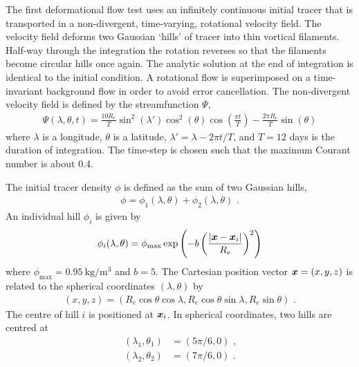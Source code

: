 The first deformational flow test uses an infinitely continuous initial tracer that is transported in a non-divergent, time-varying, rotational velocity field.
The velocity field deforms two Gaussian `hills' of tracer into thin vortical filaments.  Half-way through the integration the rotation reverses so that the filaments become circular hills once again.  The analytic solution at the end of integration is identical to the initial condition.
A rotational flow is superimposed on a time-invariant background flow in order to avoid error cancellation.
The non-divergent velocity field is defined by the streamfunction $\Psi$,
\begin{align}
	\Psi(\lambda, \theta, t) = \frac{10 R_e}{T} \sin^2 \left(\lambda'\right) \cos^2 \left(\theta\right) \cos \left( \frac{\pi t}{T} \right) - \frac{2 \pi R_e}{T} \sin\left(\theta\right)
\end{align}
where $\lambda$ is a longitude, $\theta$ is a latitude, $\lambda' = \lambda - 2 \pi t / T$, and $T = \num{12}$ days is the duration of integration.  The time-step is chosen such that the maximum Courant number is about 0.4.

The initial tracer density $\phi$ is defined as the sum of two Gaussian hills,
\begin{align}
	\phi = \phi_1(\lambda, \theta) + \phi_2(\lambda, \theta) \text{ .}
\end{align}
An individual hill $\phi_i$ is given by
\begin{align}
	\phi_i(\lambda, \theta) = \phi_\mathrm{max} \exp\left( -b \left( \frac{\left\lvert \bm{x} - \bm{x}_i \right\rvert}{R_e} \right)^2 \right)
\end{align}
where $\phi_\mathrm{max} = \SI{0.95}{\kilo\gram\per\meter\cubed}$ and $b = 5$.  The Cartesian position vector $\bm{x} = (x,y,z)$ is related to the spherical coordinates $(\lambda, \theta)$ by
\begin{align}
	(x,y,z) = (R_e \cos \theta \cos \lambda, R_e \cos \theta \sin \lambda, R_e \sin \theta) \label{eqn:cubicFit:spherical-cartesian} \text{ .}
\end{align}
The centre of hill $i$ is positioned at $\bm{x}_i$.  In spherical coordinates, two hills are centred at
\begin{align}
	(\lambda_1,\theta_1) &= (5 \pi /6, 0) \text{ ,} \\
	(\lambda_2,\theta_2) &= (7 \pi /6, 0) \text{ .}
\end{align}

